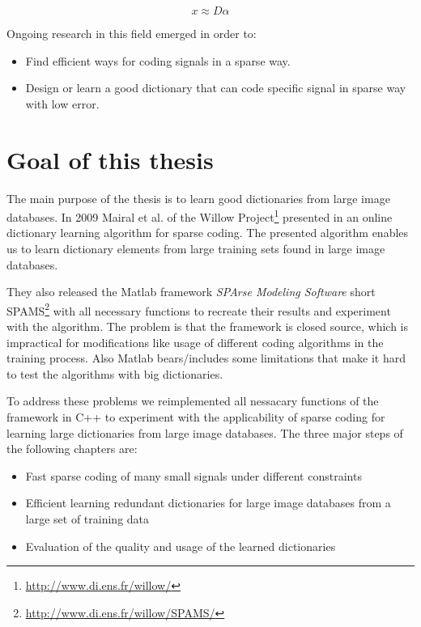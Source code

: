 \begin{equation}
 x \approx D\alpha
\end{equation}



Ongoing research in this field emerged in order to:
\begin{itemize}
 \item Find efficient ways for coding signals in a sparse way.
 \item Design or learn a good dictionary that can code specific signal in sparse
way with low error.
\end{itemize}


\section{Goal of this thesis}
The main purpose of the thesis is to learn good dictionaries from large
image databases. %
In 2009 Mairal et al. of the Willow
Project\footnote{\url{http://www.di.ens.fr/willow/}} presented in
\cite{Mairal2009,Mairal2010} an online dictionary learning algorithm for sparse
coding. The presented algorithm enables us to learn dictionary elements from
large training sets found in large image databases.

They also released the Matlab framework \emph{SPArse Modeling Software}
short SPAMS\footnote{\url{http://www.di.ens.fr/willow/SPAMS/}} with all
necessary functions to recreate their results and experiment with the algorithm.
The problem is that the framework is closed source, which is impractical for
modifications like usage of different coding algorithms in the training process.
Also Matlab bears/includes some limitations that make it hard to test the
algorithms with big dictionaries.

To address these problems we reimplemented all nessacary functions of the
framework in C++ to experiment with the applicability of sparse coding for
learning large dictionaries from large image databases. The three major steps of
the following chapters are:

\begin{itemize}
 \item Fast sparse coding of many small signals under different constraints
 \item Efficient learning redundant dictionaries for large image databases from
a large set of training data
 \item Evaluation of the quality and usage of the learned dictionaries
\end{itemize}

